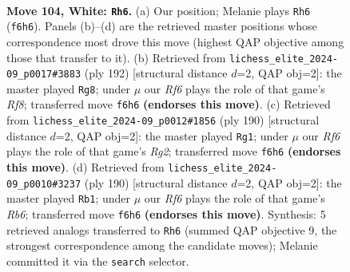 \documentclass[11pt]{article}
\begin{document}
\clearpage

\begin{figure}[p]\centering
\begin{subfigure}{0.46\textwidth}\centering
\resizebox{\linewidth}{!}{%
\newchessgame
\chessboard[
  setfen={6R1/3k4/5R2/8/8/5K2/8/8 w - - 1 104},
  showmover=false,
  pgfstyle=straightmove, color=movearrow, markmove={f6-h6}
]}
\caption{}
\end{subfigure}\hfill
\begin{subfigure}{0.46\textwidth}\centering
\resizebox{\linewidth}{!}{%
\newchessgame
\chessboard[
  setfen={5R2/3k4/r7/8/8/5K2/8/8 w - - 52 97},
  showmover=false,
  pgfstyle=straightmove, color=movearrow, markmove={f8-g8}
]}
\caption{}
\end{subfigure}
\\[4pt]
\begin{subfigure}{0.46\textwidth}\centering
\resizebox{\linewidth}{!}{%
\newchessgame
\chessboard[
  setfen={8/1r6/7k/8/8/8/4K1R1/8 w - - 3 96},
  showmover=false,
  pgfstyle=straightmove, color=movearrow, markmove={g2-g1}
]}
\caption{}
\end{subfigure}\hfill
\begin{subfigure}{0.46\textwidth}\centering
\resizebox{\linewidth}{!}{%
\newchessgame
\chessboard[
  setfen={8/8/1R1K4/8/7r/k7/8/8 w - - 14 96},
  showmover=false,
  pgfstyle=straightmove, color=movearrow, markmove={b6-b1}
]}
\caption{}
\end{subfigure}
\caption{\textbf{Move 104, White: \texttt{Rh6}.} (a) Our position; Melanie plays \texttt{Rh6} (\texttt{f6h6}). Panels (b)--(d) are the retrieved master positions whose correspondence most drove this move (highest QAP objective among those that transfer to it). (b) Retrieved from \texttt{lichess\_elite\_2024-09\_p0017\#3883} (ply 192) [structural distance $d$=2, QAP obj=2]: the master played \texttt{Rg8}; under $\mu$ our \emph{Rf6} plays the role of that game's \emph{Rf8}; transferred move \texttt{f6h6} \textbf{(endorses this move)}. (c) Retrieved from \texttt{lichess\_elite\_2024-09\_p0012\#1856} (ply 190) [structural distance $d$=2, QAP obj=2]: the master played \texttt{Rg1}; under $\mu$ our \emph{Rf6} plays the role of that game's \emph{Rg2}; transferred move \texttt{f6h6} \textbf{(endorses this move)}. (d) Retrieved from \texttt{lichess\_elite\_2024-09\_p0010\#3237} (ply 190) [structural distance $d$=2, QAP obj=2]: the master played \texttt{Rb1}; under $\mu$ our \emph{Rf6} plays the role of that game's \emph{Rb6}; transferred move \texttt{f6h6} \textbf{(endorses this move)}. Synthesis: 5 retrieved analogs transferred to \texttt{Rh6} (summed QAP objective 9, the strongest correspondence among the candidate moves); Melanie committed it via the \texttt{search} selector.}
\label{fig:thought-m206}
\end{figure}
\end{document}
